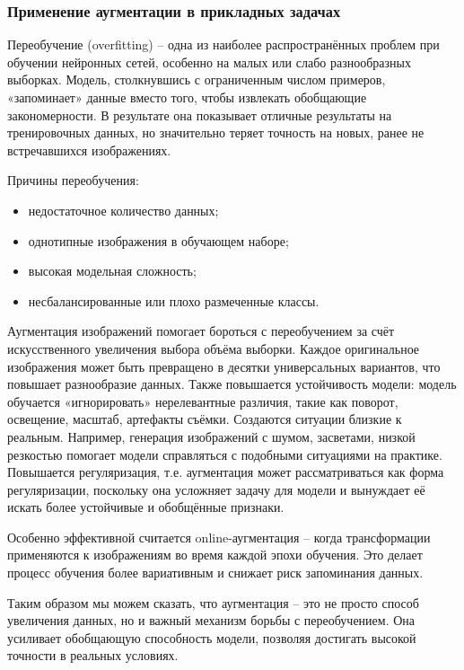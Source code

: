 \subsubsection{Применение аугментации в прикладных задачах}

Переобучение (overfitting) – одна из наиболее распространённых проблем при обучении нейронных сетей, особенно на малых или слабо разнообразных выборках. Модель, столкнувшись с ограниченным числом примеров, «запоминает» данные вместо того, чтобы извлекать обобщающие закономерности. В результате она показывает отличные результаты на тренировочных данных, но значительно теряет точность на новых, ранее не встречавшихся изображениях.

Причины переобучения:

\begin{itemize}
	\item недостаточное количество данных;
	\item однотипные изображения в обучающем наборе;
	\item высокая модельная сложность;
	\item несбалансированные или плохо размеченные классы.
\end{itemize}

Аугментация изображений помогает бороться с переобучением за счёт искусственного увеличения выбора объёма выборки. Каждое оригинальное изображения может быть превращено в десятки универсальных вариантов, что повышает разнообразие данных. Также повышается устойчивость модели: модель обучается «игнорировать» нерелевантные различия, такие как поворот, освещение, масштаб, артефакты съёмки. Создаются ситуации близкие к реальным. Например, генерация изображений с шумом, засветами, низкой резкостью помогает модели справляться с подобными ситуациями на практике. Повышается регуляризация, т.е. аугментация может рассматриваться как форма регуляризации, поскольку она усложняет задачу для модели и вынуждает её искать более устойчивые и обобщённые признаки.

Особенно эффективной считается online-аугментация – когда трансформации применяются к изображениям во время каждой эпохи обучения. Это делает процесс обучения более вариативным и снижает риск запоминания данных.

Таким образом мы можем сказать, что аугментация – это не просто способ увеличения данных, но и важный механизм борьбы с переобучением. Она усиливает обобщающую способность модели, позволяя достигать высокой точности в реальных условиях.
